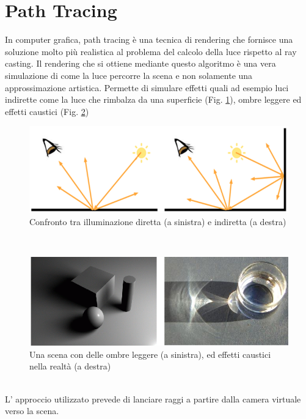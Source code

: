 \newpage
\section{Path Tracing}
\label{sec:chapter_stato_arte_path_tracing}
In computer grafica, path tracing è una tecnica di rendering che fornisce una soluzione molto più realistica al problema del calcolo della luce rispetto al ray casting.
Il rendering che si ottiene mediante questo algoritmo è una vera simulazione di come la luce percorre la scena e non solamente una approssimazione artistica. Permette di simulare effetti quali ad esempio luci indirette come la luce che rimbalza da una superficie (Fig. \ref{fig:stato_arte_luci_dir_ind}), ombre leggere ed effetti caustici (Fig. \ref{fig:stato_arte_ombre_caust}) 
\\
\begin{figure}[htb]
 \centering
 \includegraphics[width=0.9\linewidth]{images/chapter_stato_arte/stato_arte_luci_dir_ind.png}\hfill
 \caption[Illuminazione diretta e indiretta]{Confronto tra illuminazione diretta (a sinistra) e indiretta (a destra)}
 \label{fig:stato_arte_luci_dir_ind}
\end{figure}
\\
\begin{figure}[htb]
 \centering
 \includegraphics[width=0.9\linewidth]{images/chapter_stato_arte/stato_arte_ombre_caust.png}\hfill
 \caption[Ombreggiature ed effetti caustici]{Una scena con delle ombre leggere (a sinistra), ed effetti caustici nella realtà (a destra)}
 \label{fig:stato_arte_ombre_caust}
\end{figure}
\\
L’ approccio utilizzato prevede di lanciare raggi a partire dalla camera virtuale verso la scena. 

